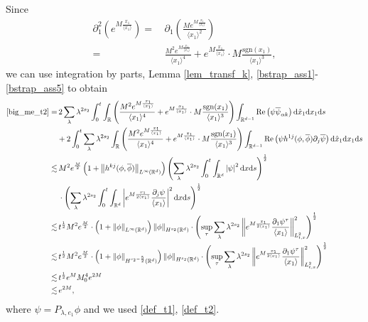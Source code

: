\documentclass[10pt,twoside,a4paper]{article}
\numberwithin{equation}{section}\allowdisplaybreaks
\begin{document}
Since 
\begin{align*}
	\partial_1^2 (e^{M \frac{x_1}{\langle x_1\rangle} } )=& \,	\partial_1 \left( \frac{ M	e^{M \frac{x_1}{\langle x_1\rangle} } }{\langle x_1\rangle^2}  \right) \\
	=&  \, \frac{ M^2	e^{M \frac{x_1}{\langle x_1\rangle} } }{\langle x_1\rangle^4} +e^{M \frac{x_1}{\langle x_1\rangle} } \cdot M \frac{\mathrm{sgn}(x_1)}{\langle x_1\rangle^3}, 
\end{align*}
we can use integration by parts, Lemma \ref{lem_transf_k}, \eqref{bstrap_ass1}-\eqref{bstrap_ass5} to obtain
\begin{align*}  
	\eqref{big_me_t2}	=&\, 2 \sum_{\lambda} \lambda^{ 2s_2}\int_0^t \int_{\mathbb{R}}   	\left(\frac{ M^2	e^{M \frac{x_1}{\langle x_1\rangle} } }{\langle x_1\rangle^4} +e^{M \frac{x_1}{\langle x_1\rangle} } \cdot M \frac{\mathrm{sgn}(x_1)}{\langle x_1\rangle^3} \right) \int_{\mathbb{R}^{d-1}} \mathrm{Re}\left( \psi  \overline{\psi}_{\alpha k}\right) \mathrm{d} \hat{x}_1   \mathrm{d} x_1 \mathrm{d} s \\
	&+2\int_0^t\sum_{\lambda} \lambda^{ 2s_2} \int_{\mathbb{R}}    \left(\frac{ M^2	e^{M \frac{x_1}{\langle x_1\rangle} } }{\langle x_1\rangle^4} +e^{M \frac{x_1}{\langle x_1\rangle} } \cdot M\frac{\mathrm{sgn}(x_1)}{\langle x_1\rangle^3} \right) \int_{\mathbb{R}^{d-1}} \mathrm{Re}\left( \psi   h^{1j} (\phi,\overline{\phi}) \partial_j \overline{\psi}\right) \mathrm{d} \hat{x}_1   \mathrm{d} x_1 \mathrm{d} s\\
	\lesssim&\,  M^2 e^{\frac {M}{2}}\left(1+\left\|h^{kj} (\phi,\overline{\phi}) \right\|_{L^{\infty}(\mathbb{R}^d)}\right)\left(  \sum_{\lambda} \lambda^{ 2s_2}\int_0^t     \int_{\mathbb{R}^{d}} \left|   \psi   \right|^2  \mathrm{d} x \mathrm{d} s\right)^{\frac 12}  \\
	&\,\cdot \left(  \sum_{\lambda} \lambda^{ 2s_2} \int_0^t     \int_{\mathbb{R}^{d}} \left|e^{M \frac{x_1}{2\langle x_1\rangle} } \frac{\partial_j \psi  } {\langle x_1\rangle}\right|^2  \mathrm{d} x \mathrm{d} s\right)^{\frac 12}\\
	\lesssim&\, t^{\frac12} M^2  e^{\frac {M}{2}} \cdot  \left(1+\left\|\phi \right\|_{L^{\infty}(\mathbb{R}^d)}\right)\left\|    \phi\right\|_{H^{s_2}(\mathbb{R}^d)} \cdot  \left( \sup_{\tau}   \sum_{\lambda} \lambda^{ 2s_2} \left\| e^{M \frac{x_1}{2\langle x_1\rangle} } \frac{\partial_1 \psi^\tau }{\langle x_1\rangle }  \right\|_{L^2_{t,x}}^2\right)^{\frac 12}\nonumber \\
	\lesssim&\, t^{\frac12} M^2  e^{\frac {M}{2}} \cdot  \left(1+\left\|    \phi\right\|_{H^{s_2-\frac 52}(\mathbb{R}^d)}\right)\left\|    \phi\right\|_{H^{s_2}(\mathbb{R}^d)} \cdot  \left( \sup_{\tau}   \sum_{\lambda} \lambda^{ 2s_2} \left\| e^{M \frac{x_1}{2\langle x_1\rangle} } \frac{\partial_1 \psi^\tau }{\langle x_1\rangle }  \right\|_{L^2_{t,x}}^2\right)^{\frac 12}\nonumber \\
	\lesssim&\,  t^{\frac12} e^{M}  M_0^4  e^{2M}\\
	\lesssim&\, e^{2M},
\end{align*}
where $  \psi=P_{\lambda,e_1}  \phi  $ and we used  \eqref{def_t1}, \eqref{def_t2}.
\end{document}
